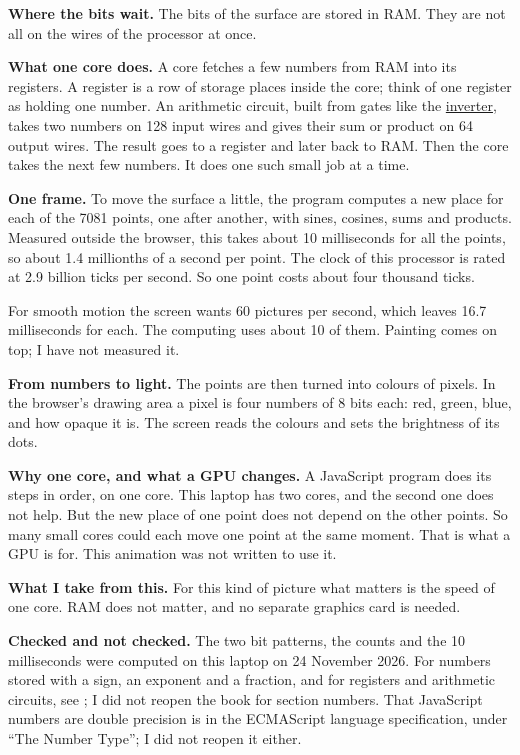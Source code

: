 \medskip\noindent
{\bf Where the bits wait.}
The bits of the surface are stored in RAM.
They are not all on the wires of the
processor at once.

\medskip\noindent
{\bf What one core does.}
A core fetches a few numbers from RAM into
its registers. A register is a row of
storage places inside the core; think of
one register as holding one number. An
arithmetic circuit, built from gates like
the
\href{https://www.heap-project.org/tag/0HHN}
{inverter}, takes two numbers on 128 input
wires and gives their sum or product on 64
output wires. The result goes to a register
and later back to RAM. Then the core takes
the next few numbers. It does one such small
job at a time.

\medskip\noindent
{\bf One frame.}
To move the surface a little, the program
computes a new place for each of the 7081
points, one after another, with sines,
cosines, sums and products. Measured outside
the browser, this takes about 10
milliseconds for all the points, so about
1.4 millionths of a second per point. The
clock of this processor is rated at 2.9
billion ticks per second. So one point costs
about four thousand ticks.

For smooth motion the screen wants 60
pictures per second, which leaves 16.7
milliseconds for each. The computing uses
about 10 of them. Painting comes on top; I
have not measured it.

\medskip\noindent
{\bf From numbers to light.}
The points are then turned into colours of
pixels. In the browser's drawing area a
pixel is four numbers of 8 bits each: red,
green, blue, and how opaque it is. The
screen reads the colours and sets the
brightness of its dots.

\medskip\noindent
{\bf Why one core, and what a GPU changes.}
A JavaScript program does its steps in
order, on one core. This laptop has two
cores, and the second one does not help.
But the new place of one point does not
depend on the other points. So many small
cores could each move one point at the same
moment. That is what a GPU is for. This
animation was not written to use it.

\medskip\noindent
{\bf What I take from this.}
For this kind of picture what matters is
the speed of one core. RAM does not matter,
and no separate graphics card is needed.

\medskip\noindent
{\bf Checked and not checked.}
The two bit patterns, the counts and the 10
milliseconds were computed on this laptop on
24 November 2026. For numbers stored with a
sign, an exponent and a fraction, and for
registers and arithmetic circuits, see
\cite{harris-digital-design}; I did not
reopen the book for section numbers. That
JavaScript numbers are double precision is
in the ECMAScript language specification,
under ``The Number Type''; I did not reopen
it either.

